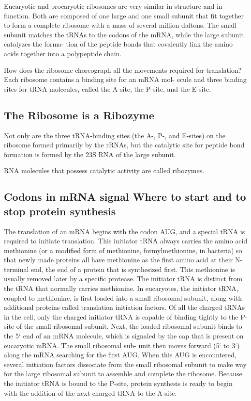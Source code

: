 Eucaryotic and procaryotic ribosomes are very similar in structure and
in function. Both are composed of one large and one small subunit that
fit together to form a complete ribosome with a mass of several million daltons.
The small subunit matches the tRNAs to
the codons of the mRNA, while the large subunit catalyzes the forma-
tion of the peptide bonds that covalently link the amino acids together
into a polypeptide chain.

How does the ribosome choreograph all the movements required for
translation? Each ribosome contains a binding site for an mRNA mol-
ecule and three binding sites for tRNA molecules, called the A-site, the
P-site, and the E-site.

\subsection{The Ribosome is a Ribozyme}

Not only are the three tRNA-binding sites (the A-, P-, and E-sites) on the
ribosome formed primarily by the rRNAs, but the catalytic site for peptide
bond formation is formed by the 23S RNA of the large subunit.

RNA molecules that possess catalytic activity are called ribozymes.

\subsection{Codons in mRNA signal Where to start and to stop protein synthesis}

The translation of an mRNA begins with the codon AUG, and a special
tRNA is required to initiate translation. This initiator tRNA always carries
the amino acid methionine (or a modified form of methionine, formylmethionine,
in bacteria) so that newly made proteins all have methionine
as the first amino acid at their N-terminal end, the end of a protein that
is synthesized first. This methionine is usually removed later by a specific
protease. The initiator tRNA is distinct from the tRNA that normally carries methionine.
In eucaryotes, the initiator tRNA, coupled to methionine, is first loaded into
a small ribosomal subunit, along with additional proteins called translation
initiation factors. Of all the charged tRNAs in the cell,
only the charged initiator tRNA is capable of binding tightly to the P-site
of the small ribosomal subunit. Next, the loaded ribosomal subunit binds
to the 5` end of an mRNA molecule, which is signaled by the cap that is
present on eucaryotic mRNA. The small ribosomal sub-
unit then moves forward (5` to 3`) along the mRNA searching for the first
AUG. When this AUG is encountered, several initiation factors dissociate
from the small ribosomal subunit to make way for the large ribosomal
subunit to assemble and complete the ribosome. Because the initiator
tRNA is bound to the P-site, protein synthesis is ready to begin with the
addition of the next charged tRNA to the A-site.

